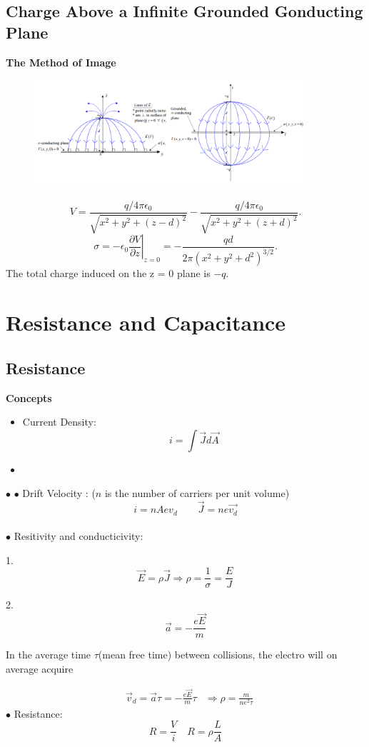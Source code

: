\documentclass[11pt, a4paper]{article}
\begin{document}
\subsection{Charge Above a Infinite Grounded Gonducting Plane}

\textbf{The Method of Image}
\begin{figure}[htbp]
    \centering
    \includegraphics[height = 4cm]{11.png}
\end{figure}
$$V=\frac{q/4\pi\epsilon_0}{\sqrt{x^2+y^2+(z-d)^2}}-\frac{q/4\pi\epsilon_0}{\sqrt{x^2+y^2+(z+d)^2}}.$$
$$\sigma=-\epsilon_0\left.\frac{\partial V}{\partial z}\right|_{z=0}=-\frac{qd}{2\pi(x^2+y^2+d^2)^{3/2}}.$$
The total charge induced on the z = 0 plane is $-q$.
\section{Resistance and Capacitance}
\subsection{Resistance}
\indent \textbf{Concepts}\\
\begin{itemize}
    \item Current Density: $$i =\int \vec{J}d\vec{A}$$ 
    \item 
\end{itemize}
$\bullet$ 
$\bullet$ Drift Velocity : ($n$ is the number of carriers per unit volume) $$i = nAev_d \qquad \vec{J} = ne\vec{v_d}$$ \\
$\bullet$ Resitivity and conducticivity: 

1. $$\vec{E} = \rho \vec{J} \Rightarrow \rho = \frac{1}{\sigma} = \frac{E}{J} $$

2. $$\vec{a} = -\frac{e\vec{E}}{m}$$

In the average time $\tau$(mean free time) between collisions, the electro will on average acquire

$$\begin{aligned}
    &\vec{v}_d = \vec{a}\tau = -\frac{e\vec{E}}{m}\tau
    &\Rightarrow \boxed{\rho= \frac{m}{ne^2 \tau}}
\end{aligned}$$
\indent $\bullet$ Resistance:$$R=  \frac{V}{i}\quad R = \rho\frac{L}{A}$$
\end{document}
